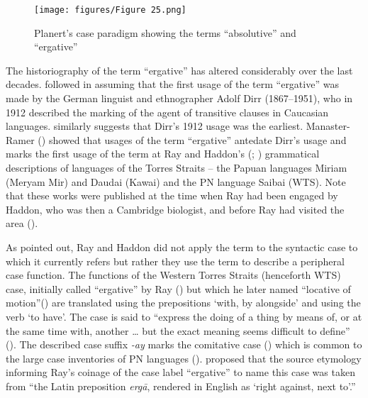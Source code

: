 \begin{figure}
\texttt{[image: figures/Figure 25.png]}
\caption{Planert’s case paradigm showing the terms “absolutive” and “ergative” \citep[555]{planert_australische_1907}}
\label{fig:2:25}
\end{figure} 

The historiography of the term “ergative” has altered considerably over the last decades. \citet[191]{seely_ergative_1977} followed \citet[363]{regamey_propos_1954} in assuming that the first usage of the term “ergative” was made by the German linguist and ethnographer Adolf Dirr (1867–1951), who in 1912 described the marking of the agent of transitive clauses in Caucasian languages. \citet[3]{dixon_ergativity_1994} similarly suggests that Dirr’s 1912 usage was the earliest. Manaster-Ramer (\citeyear[211]{manaster-ramer_origin_1994}) showed that usages of the term “ergative” antedate Dirr’s usage and marks the first usage of the term at Ray and Haddon’s (\citeyear{ray_study_1893}; \citealt{ray_haddon_1897}) grammatical descriptions of languages of the Torres Straits – the Papuan languages Miriam (Meryam Mir) and Daudai (Kawai) and the PN language Saibai (WTS). Note that these works were published at the time when Ray had been engaged by Haddon, who was then a Cambridge biologist, and before Ray had visited the area ().

As \citet[212]{manaster-ramer_origin_1994} pointed out, Ray and Haddon did not apply the term to the syntactic case to which it currently refers but rather they use the term to describe a peripheral case function. The functions of the Western Torres Straits (henceforth WTS) case, initially called “ergative” by Ray (\citealt[130--8]{ray_haddon_1897}) but which he later named “locative of motion”(\citeyear[19]{ray_linguistics_1907}) are translated using the prepositions `with, by alongside' and using the verb `to have’. The case is said to “express the doing of a thing by means of, or at the same time with, another … but the exact meaning seems difficult to define” (\citeyear[138]{ray_linguistics_1907}). The described case suffix \textit{-ay} marks the comitative case (\citealt[19]{alpher_western_2008}) which is common to the large case inventories of PN languages (\citealt[9]{dixon_introduction_1976}). \citet[213]{manaster-ramer_origin_1994} proposed that the source etymology informing Ray’s coinage of the case label “ergative” to name this case was taken from “the Latin preposition \textit{ergā}, rendered in English as `right against, next to'.”

